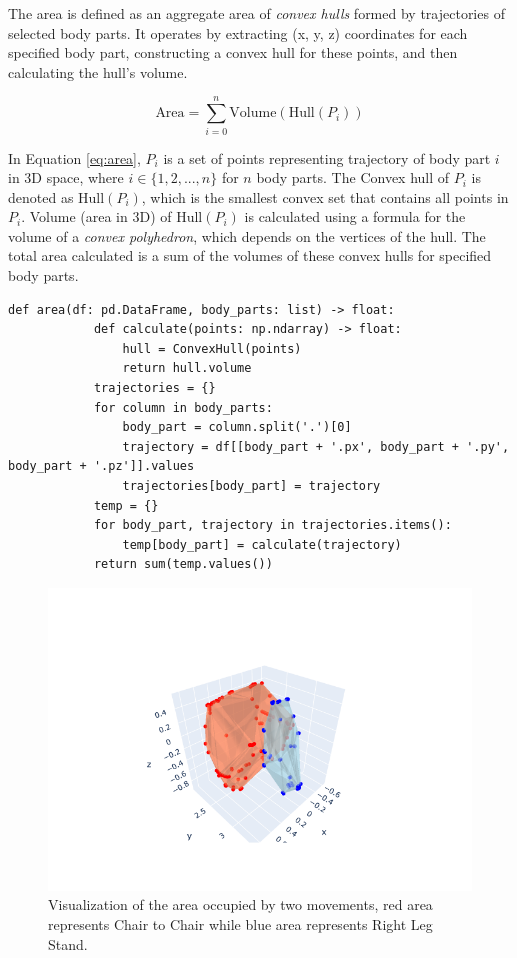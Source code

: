                 The area is defined as an aggregate area of \textit{convex hulls} formed by trajectories of selected body parts. It operates by extracting (x, y, z) coordinates for each specified body part, constructing a convex hull for these points, and then calculating the hull's volume.

                \begin{equation}\label{eq:area}
                    \text{Area} = \sum_{i=0}^{n} \text{Volume}(\text{Hull}(P_i))
                \end{equation}
            
                In Equation \ref{eq:area}, $P_i$ is a set of points representing trajectory of body part $i$ in 3D space, where $i \in \{1, 2, ..., n\}$ for $n$ body parts. The Convex hull of $P_i$ is denoted as $\text{Hull}(P_i)$, which is the smallest convex set that contains all points in $P_i$. Volume (area in 3D) of $\text{Hull}(P_i)$ is calculated using a formula for the volume of a \textit{convex polyhedron}, which depends on the vertices of the hull. The total area calculated is a sum of the volumes of these convex hulls for specified body parts.
                
        \begin{lstlisting}[caption={Area calculation method using \textit{ConvexHull class} from \textit{SciPy} library \cite{2020SciPy-NMeth}.}] 
        def area(df: pd.DataFrame, body_parts: list) -> float:
            def calculate(points: np.ndarray) -> float:
                hull = ConvexHull(points)
                return hull.volume
            trajectories = {}
            for column in body_parts:
                body_part = column.split('.')[0]
                trajectory = df[[body_part + '.px', body_part + '.py', body_part + '.pz']].values
                trajectories[body_part] = trajectory
            temp = {}
            for body_part, trajectory in trajectories.items():
                temp[body_part] = calculate(trajectory)
            return sum(temp.values())
        \end{lstlisting}

                \begin{figure}[H]
                    \centering
                    \includegraphics[width=.6\textwidth]{../src/resources/plots/feat-eng/area_difference.png}
                    \caption{
                        Visualization of the area occupied by two movements, red area represents Chair to Chair while blue area represents Right Leg Stand. 
                    }
                    \label{fig:area}
                \end{figure}
            
